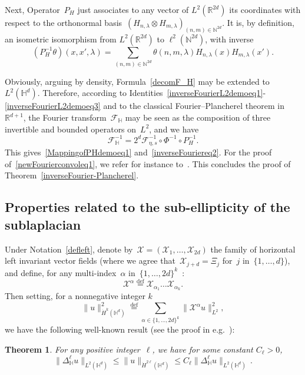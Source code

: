 \documentclass[11pt]{article}
\newtheorem{theo}{Theorem}[section]
\theoremstyle{definition}
\numberwithin{equation}{section}
\numberwithin{figure}{section}
\numberwithin{table}{section}
\newcommand{\lam}{\lambda}
\newcommand*\cF{\mathcal{F}}
\newcommand*\cX{\mathcal{X}}
\newcommand*\N{\mathbb{N}}
\newcommand*\R{\mathbb{R}}
\newcommand*\bbH{\mathbb{H}}
\newcommand*\eqdefa{\overset{\mathrm{def}}{=}}
\begin{document}
Next, Operator~$P_H$ just associates to any vector of $L^2(\R^{2d})$ its coordinates with respect to the orthonormal basis~$\left(H_{n,\lam}\otimes H_{m,\lam} \right)_{(n,m)\in \N^{2d}}$. It is, by definition, an isometric isomorphism from $L^2(\R^{2d})$ to $\ell^2(\N^{2d})$, with inverse
\begin{equation}\label{inverseFourierL2demoeq3}
(P_H^{-1} \theta)(x,x',\lam) = \sum_{(n,m)\in \N^{2d}} \theta(n,m,\lam) H_{n,\lam} (x) H_{m,\lam}(x').
\end{equation}

Obviously, arguing by density, Formula~\eqref{decomF_H} may be extended to $L^2(\bbH^d)$. Therefore, according to Identities~\eqref{inverseFourierL2demoeq1}-\eqref{inverseFourierL2demoeq3} and to the classical Fourier--Plancherel theorem in~$\R^{d+1}$, the Fourier transform~$\cF_\bbH$ may be seen as the composition of three invertible and bounded operators on~$L^2$, and we have
\[
\cF_\bbH^{-1} = 2^d \cF_{\eta,s}^{-1} \circ \Phi^{-1} \circ P_H^{-1}.
\]
This gives~\eqref{MappingofPHdemoeq1} and~\eqref{inverseFouriereq2}. For the proof of~\eqref{newFourierconvoleq1}, we refer for instance to~\cite{bcdFHspace}. This concludes the proof of Theorem~\ref{inverseFourier-Plancherel}.

\subsection{Properties related to the sub-ellipticity of the sublaplacian} \label{subellipticity}

Under Notation~\eqref{defleft}, denote by~${\cX}=(\cX_1,\dots,\cX_{2d})$ the family of horizontal left invariant vector fields (where we agree that~$\cX_{j+d}=\Xi_j$ for~$j$ in~$ \{1,\dots, d\}$), and define, for any multi-index~$\alpha$ in~$ \{1,\dots, 2d\}^k$~:
\begin{equation}\label{prodreal}
\mathcal{\cX}^{\alpha} \eqdefa \cX_{\alpha_1}\dots
\cX_{\alpha_k}.
\end{equation}
Then setting, for a nonnegative integer $k$
\[
\|u\|_{\dot H^k(\bbH^d)}^2 \eqdefa \sum_{\alpha\in \{1,\dots,2d\}^k} \|\cX^\alpha u\|_{L^2}^2,
\]
we have the following well-known result (see the proof in e.g.~\cite{CCX,H}):

\begin{theo}\label{maximalestimatepaire}
For any positive integer~$\ell$, we have for some constant $C_\ell>0$,
\[
\|\Delta_{\bbH} ^\ell u\|_{L^2(\bbH^d)}\leq \|u\|_{\dot H^{2\ell}(\bbH^d)}
\leq C_\ell\|\Delta_{\bbH} ^\ell u\|_{L^2(\bbH^d)}\,.
\]
\end{theo}
\end{document}
